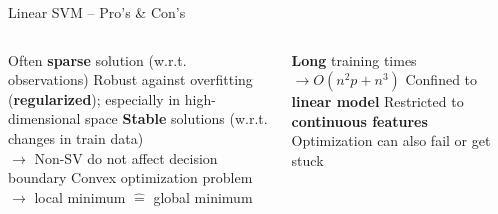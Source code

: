 \begin{frame}{Linear SVM -- Pro's \& Con's}

\begin{columns}[onlytextwidth]
  \begin{column}{0.5\textwidth}
    \footnotesize
    \begin{itemize}
      \positem Often \textbf{sparse} solution (w.r.t. observations)
      \positem Robust against overfitting (\textbf{regularized}); especially in 
      high-dimensional space
      \positem \textbf{Stable} solutions (w.r.t. changes in train data)\\
      $\rightarrow$ Non-SV do not affect decision boundary
      \positem Convex optimization problem \\
      $\rightarrow$ local minimum $\hat{=}$ global minimum
    \end{itemize}
  \end{column}

  \begin{column}{0.5\textwidth}
    \footnotesize
    \begin{itemize}
      \negitem \textbf{Long} training times $\rightarrow O(n^2 p + n^3)$
      \negitem Confined to \textbf{linear model}
      \negitem Restricted to \textbf{continuous features}
      \negitem Optimization can also fail or get stuck
    \end{itemize}
  \end{column}
\end{columns}

\vfill

\small


\end{frame}